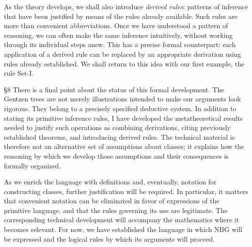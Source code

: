 As the theory develops, we shall also introduce \textit{derived rules}: patterns of inference that have been justified by means of the rules already available. Such rules are more than convenient abbreviations. Once we have understood a pattern of reasoning, we can often make the same inference intuitively, without working through its individual steps anew. This has a precise formal counterpart: each application of a derived rule can be replaced by an appropriate derivation using rules already established. We shall return to this idea with our first example, the rule Set-I.

§8 \quad There is a final point about the status of this formal development. The Gentzen trees are not merely illustrations intended to make our arguments look rigorous. They belong to a precisely specified deductive system. In addition to stating its primitive inference rules, I have developed the metatheoretical results needed to justify such operations as combining derivations, citing previously established theorems, and introducing derived rules. The technical material is therefore not an alternative set of assumptions about classes; it explains how the reasoning by which we develop those assumptions and their consequences is formally organized.

As we enrich the language with definitions and, eventually, notation for constructing classes, further justification will be required. In particular, it matters that convenient notation can be eliminated in favor of expressions of the primitive language, and that the rules governing its use are legitimate. The corresponding technical development will accompany the mathematics where it becomes relevant. For now, we have established the language in which NBG will be expressed and the logical rules by which its arguments will proceed.
